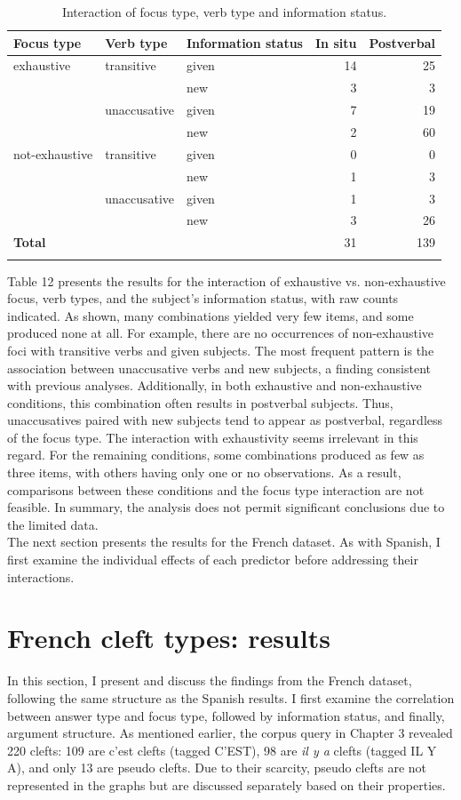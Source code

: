 \begin{table}
\begin{tabular}[t]{lllrr}
\lsptoprule
Focus type & Verb type & Information status & In situ & Postverbal\\
\midrule
exhaustive & transitive & given & 14 & 25\\
& & new &  3 & 3\\
& unaccusative & given & 7 & 19\\
& & new & 2 & 60\\
not-exhaustive & transitive & given & 0 & 0\\
 & & new & 1 & 3\\
& unaccusative & given & 1 & 3\\
& & new & 3 & 26\\
\midrule
\textbf{Total} & & & 31 & 139\\
\lspbottomrule
\end{tabular}
\caption{
Interaction of focus type, verb type and information status.}
\end{table}


Table 12 presents the results for the interaction of exhaustive vs. non-exhaustive focus, verb types, and the subject's information status, with raw counts indicated. As shown, many combinations yielded very few items, and some produced none at all. For example, there are no occurrences of non-exhaustive foci with transitive verbs and given subjects.
The most frequent pattern is the association between unaccusative verbs and new subjects, a finding consistent with previous analyses. Additionally, in both exhaustive and non-exhaustive conditions, this combination often results in postverbal subjects. Thus, unaccusatives paired with new subjects tend to appear as postverbal, regardless of the focus type. The interaction with exhaustivity seems irrelevant in this regard.
For the remaining conditions, some combinations produced as few as three items, with others having only one or no observations. As a result, comparisons between these conditions and the focus type interaction are not feasible.
In summary, the analysis does not permit significant conclusions due to the limited data.\\
The next section presents the results for the French dataset. As with Spanish, I first examine the individual effects of each predictor before addressing their interactions.


\section{French cleft types: results}
In this section, I present and discuss the findings from the French dataset, following the same structure as the Spanish results. I first examine the correlation between answer type and focus type, followed by information status, and finally, argument structure. As mentioned earlier, the corpus query in Chapter 3 revealed 220 clefts: 109 are c’est clefts (tagged {\selectfont C'EST}), 98 are \textit{il y a} clefts (tagged {\selectfont IL Y A}), and only 13 are pseudo clefts. Due to their scarcity, pseudo clefts are not represented in the graphs but are discussed separately based on their properties.


